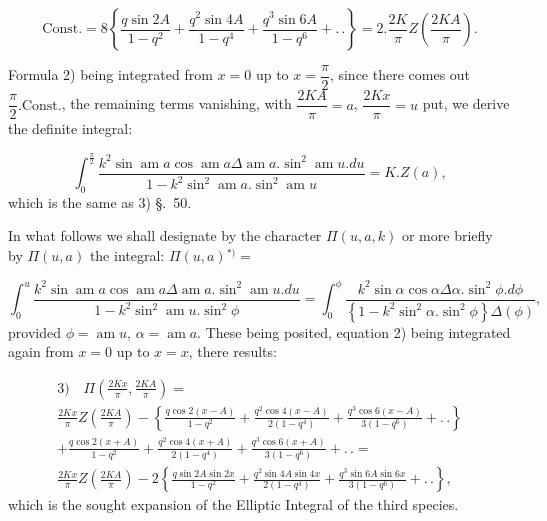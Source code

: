 \documentclass{article}
\begin{document}
\[
\text{Const.}=8\left\{\frac{q\sin2A}{1-q^{2}}+\frac{q^{2}\sin4A}{1-q^{4}}+\frac{q^{3}\sin6A}{1-q^{6}}+.\,.\right\}=2.\frac{2K}{\pi}Z\left(\frac{2KA}{\pi}\right).
\]

Formula 2) being integrated from $x=0$ up to $x=\dfrac{\pi}{2}$, since there comes out $\dfrac{\pi}{2}.\text{Const.}$, the remaining terms vanishing, with $\dfrac{2KA}{\pi}=a$, $\dfrac{2Kx}{\pi}=u$ put, we derive the definite integral:

\[
\int_{0}^{\frac{\pi}{2}}\frac{k^{2}\sin\operatorname{am}a\cos\operatorname{am}a\Delta\operatorname{am}a.\sin^{2}\operatorname{am}u.du}{1-k^{2}\sin^{2}\operatorname{am}a.\sin^{2}\operatorname{am}u}=K.Z(a),
\]
which is the same as 3) §.\ 50.

In what follows we shall designate by the character $\Pi(u,a,k)$ or more briefly by $\Pi(u,a)$ the integral: $\Pi(u,a){}^{*)}=$

\[
\int_{0}^{u}\frac{k^{2}\sin\operatorname{am}a\cos\operatorname{am}a\Delta\operatorname{am}a.\sin^{2}\operatorname{am}u.du}{1-k^{2}\sin^{2}\operatorname{am}u.\sin^{2}\phi}=\int_{0}^{\phi}\frac{k^{2}\sin\alpha\cos\alpha\Delta\alpha.\sin^{2}\phi.d\phi}{\left\{1-k^{2}\sin^{2}\alpha.\sin^{2}\phi\right\}\Delta(\phi)},
\]
provided $\phi=\operatorname{am}u$, $\alpha=\operatorname{am}a$. These being posited, equation 2) being integrated again from $x=0$ up to $x=x$, there results:

\[
\begin{gathered}
\text{3)}\quad\Pi\left(\frac{2Kx}{\pi},\frac{2KA}{\pi}\right)=\\[1.5ex]
\frac{2Kx}{\pi}Z\left(\frac{2KA}{\pi}\right)-\left\{\frac{q\cos2(x-A)}{1-q^{2}}+\frac{q^{2}\cos4(x-A)}{2(1-q^{4})}+\frac{q^{3}\cos6(x-A)}{3(1-q^{6})}+.\,.\right\}\\[1.5ex]
+\frac{q\cos2(x+A)}{1-q^{2}}+\frac{q^{2}\cos4(x+A)}{2(1-q^{4})}+\frac{q^{3}\cos6(x+A)}{3(1-q^{6})}+.\,.=\\[1.5ex]
\frac{2Kx}{\pi}Z\left(\frac{2KA}{\pi}\right)-2\left\{\frac{q\sin2A\sin2x}{1-q^{2}}+\frac{q^{2}\sin4A\sin4x}{2(1-q^{4})}+\frac{q^{3}\sin6A\sin6x}{3(1-q^{6})}+.\,.\right\},
\end{gathered}
\]
which is the sought expansion of the Elliptic Integral of the third species.
\end{document}
